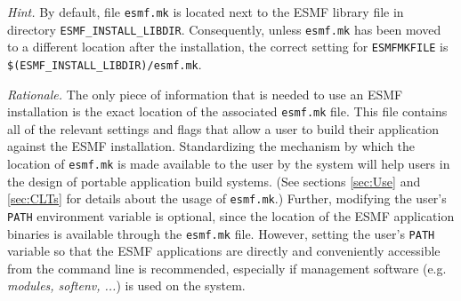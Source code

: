 {\em Hint.} By default, file {\tt esmf.mk} is located next to the ESMF library file in  directory {\tt ESMF\_INSTALL\_LIBDIR}. Consequently, unless {\tt esmf.mk} has been moved to a different location after the installation, the correct setting for {\tt ESMFMKFILE} is {\tt \$(ESMF\_INSTALL\_LIBDIR)/esmf.mk}.

{\em Rationale.} The only piece of information that is needed to use an ESMF installation is the exact location of the associated {\tt esmf.mk} file. This file contains all of the relevant settings and flags that allow a user to build their application against the ESMF installation. Standardizing the mechanism by which the location of {\tt esmf.mk} is made available to the user by the system will help users in the design of portable application build systems. (See sections \ref{sec:Use} and \ref{sec:CLTs} for details about the usage of {\tt esmf.mk}.) Further, modifying the user's {\tt PATH} environment variable is optional, since the location of the ESMF application binaries is available through the {\tt esmf.mk} file. However, setting the user's {\tt PATH} variable so that the ESMF applications are directly and conveniently accessible from the command line is recommended, especially if management software (e.g. {\em modules, softenv, ...}) is used on the system.
